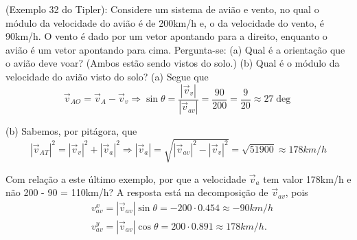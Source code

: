 \documentclass[physics_notes.tex]{subfiles}
\begin{document}
\begin{example}
	(Exemplo 32 do Tipler): Considere um sistema de avião e vento, no qual o módulo da velocidade do avião é de 200km/h e,
	o da velocidade do vento, é 90km/h. O vento é dado por um vetor apontando para a direito, enquanto o avião é um vetor apontando para cima.
	Pergunta-se: (a) Qual é a orientação que o avião deve voar? (Ambos estão sendo vistos do solo.) (b) Qual é o módulo da
	velocidade do avião visto do solo?
	(a) Segue que
	$$
		\vec{v}_{AO} = \vec{v}_{A} - \vec{v}_{v} \Rightarrow \sin{\theta} = \frac{|\vec{v}_{v}|}{|\vec{v}_{av}|} = \frac{90}{200} = \frac{9}{20}\approx 27\deg
	$$

	(b) Sabemos, por pitágora, que
	$$
		|\vec{v}_{AT}|^{2} = |\vec{v}_{v}|^{2} + |\vec{v}_{a}|^{2} \Rightarrow |\vec{v}_{a}| = \sqrt{|\vec{v}_{av}|^{2} - |\vec{v}_{v}|^{2}} = \sqrt{51900}\approx 178km/h
	$$
\end{example}
Com relação a este último exemplo, por que a velocidade $\vec{v}_{a}$ tem valor 178km/h e não 200 - 90 = 110km/h?
A resposta está na decomposição de $\vec{v}_{av}$, pois
\begin{align*}
	 & v_{av}^{x} = |\vec{v}_{av}|\sin{\theta} = -200 \cdot 0.454\approx -90km/h \\
	 & v_{av}^{y} = |\vec{v}_{av}|\cos{\theta} = 200 \cdot 0.891\approx 178km/h.
\end{align*}
\end{document}
